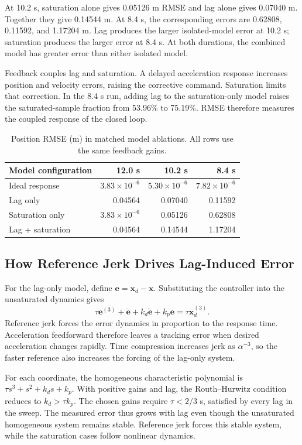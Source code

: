 \documentclass[letterpaper,10pt,conference]{ieeeconf}
\begin{document}
At 10.2 s, saturation alone gives 0.05126 m RMSE and lag alone gives 0.07040 m.
Together they give 0.14544 m.
At 8.4 s, the corresponding errors are 0.62808, 0.11592, and 1.17204 m.
Lag produces the larger isolated-model error at 10.2 s; saturation produces the larger error at 8.4 s.
At both durations, the combined model has greater error than either isolated model.

Feedback couples lag and saturation.
A delayed acceleration response increases position and velocity errors, raising the corrective command.
Saturation limits that correction.
In the 8.4 s run, adding lag to the saturation-only model raises the saturated-sample fraction from 53.96\% to 75.19\%.
RMSE therefore measures the coupled response of the closed loop.
\begin{table}[t]\centering\small
\caption{Position RMSE (m) in matched model ablations. All rows use the same feedback gains.}
\label{tab:ablation}
\setlength{\tabcolsep}{3pt}
\begin{tabular}{lrrr}\toprule
Model configuration&12.0 s&10.2 s&8.4 s\\\midrule
Ideal response&$3.83\!\times\!10^{-6}$&$5.30\!\times\!10^{-6}$&$7.82\!\times\!10^{-6}$\\
Lag only&0.04564&0.07040&0.11592\\
Saturation only&$3.83\!\times\!10^{-6}$&0.05126&0.62808\\
Lag + saturation&0.04564&0.14544&1.17204\\\bottomrule
\end{tabular}\end{table}
\subsection{How Reference Jerk Drives Lag-Induced Error}
For the lag-only model, define $\bm e=\bm x_d-\bm x$.
Substituting the controller into the unsaturated dynamics gives
\begin{equation}
\tau\bm e^{(3)}+\ddot{\bm e}+k_d\dot{\bm e}+k_p\bm e
=\tau\bm x_d^{(3)}.\label{eq:errorforcing}
\end{equation}
Reference jerk forces the error dynamics in proportion to the response time.
Acceleration feedforward therefore leaves a tracking error when desired acceleration changes rapidly.
Time compression increases jerk as $\alpha^{-3}$, so the faster reference also increases the forcing of the lag-only system.

For each coordinate, the homogeneous characteristic polynomial is $\tau s^3+s^2+k_ds+k_p$.
With positive gains and lag, the Routh--Hurwitz condition reduces to $k_d>\tau k_p$.
The chosen gains require $\tau<2/3$ s, satisfied by every lag in the sweep.
The measured error thus grows with lag even though the unsaturated homogeneous system remains stable.
Reference jerk forces this stable system, while the saturation cases follow nonlinear dynamics.
\end{document}
